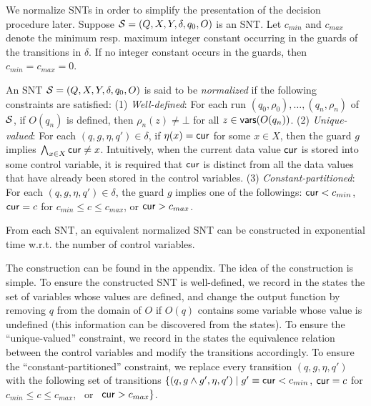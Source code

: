 We normalize SNTs in order to simplify the presentation of the decision procedure later.
Suppose ${\mathcal{S} }=(Q,X,Y,\delta,q_0,O)$ is an SNT. Let $c_{min}$ and $c_{max}$ denote the minimum resp. maximum integer constant occurring in the guards of the transitions in $\delta$. If no integer constant occurs in the guards, then $c_{min}=c_{max}=0$.

An SNT ${\mathcal{S} }=(Q,X,Y,\delta,q_0,O)$ is said to be \emph{normalized} if the following constraints are satisfied:
(1) \emph{Well-defined}: For each run $(q_0,\rho_0),\dots,(q_n,\rho_n)$ of ${\mathcal{S} }$, if $O(q_n)$ is defined, then $\rho_n(z)\neq\bot$ for all  $z\in \mathsf{vars}(O(q_n))$. (2) \emph{Unique-valued}: For each $(q,g,\eta,q') \in \delta$, if $\eta(x)=\mathsf{cur}$ for some $x \in X$, then the guard $g$ implies $\bigwedge_{x \in X} \mathsf{cur} \neq x$.  Intuitively, when the current data value $\mathsf{cur}$ is stored into some control variable, it is required that $\mathsf{cur}$ is distinct from all the data values that have already been stored in the control variables. (3) \emph{Constant-partitioned}: For each $(q, g, \eta, q') \in \delta$, the guard $g$ implies one of the followings: $\mathsf{cur} < c_{min}$, $\mathsf{cur} = c$ for $c_{min} \le c \le c_{max}$, or $\mathsf{cur} > c_{max}$. 
\begin{proposition}\label{prop-snt-norm}
	From each SNT, an equivalent normalized SNT can be constructed in  exponential time w.r.t. the number of control variables. 
\end{proposition}
The construction can be found in the appendix. The idea of the construction is simple. To ensure the constructed SNT is well-defined, we record in the states the set of variables whose values are defined, and change the output function by removing $q$ from the domain of $O$ if $O(q)$ contains some variable whose value is undefined (this information can be discovered from the states). To ensure the ``unique-valued'' constraint, we record in the states the equivalence relation between the control variables and modify the transitions accordingly. To ensure the ``constant-partitioned'' constraint, we replace every transition $(q, g, \eta, q')$ with the following set of transitions 
$\{(q, g\wedge g', \eta, q') \mid g' \equiv \mathsf{cur} < c_{min}$, $\mathsf{cur} = c$ for $c_{min} \le c \le c_{max}$, \mbox{ or } $\mathsf{cur} > c_{max}\}$.
